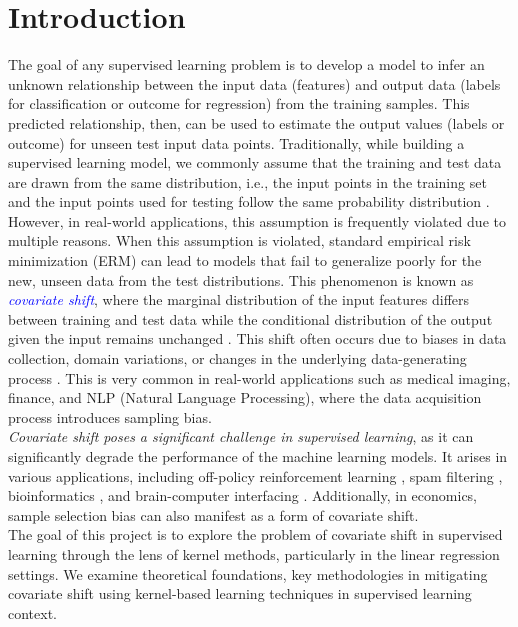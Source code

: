 \chapter{Introduction}\label{chp:1}

The goal of any supervised learning problem is to develop a model to infer an unknown relationship between the input data (features) and output data (labels for classification or outcome for regression) from the training samples. This predicted relationship, then, can be used to estimate the output values (labels or outcome) for unseen test input data points. Traditionally, while building a supervised learning model, we commonly assume that the training and test data are drawn from the same distribution, i.e., the input points in the training set and the input points used for testing follow the same probability distribution \citep{bishop1995neural, Duda2001, vapnik1998statistical, hastie2009elements}.\\

However, in real-world applications, this assumption is frequently violated due to multiple reasons. When this assumption is violated, standard empirical risk minimization (ERM) can lead to models that fail to generalize poorly for the new, unseen data from the test distributions. This phenomenon is known as \textcolor{blue}{\emph{covariate shift}}, where the marginal distribution of the input features differs between training and test data while the conditional distribution of the output given the input remains unchanged \citep{shimodaira2000improving}. This shift often occurs due to biases in data collection, domain variations, or changes in the underlying data-generating process \citep{sugiyama2000covariate}. This is very common in real-world applications such as medical imaging, finance, and NLP (Natural Language Processing), where the data acquisition process introduces sampling bias.\\

\emph{Covariate shift poses a significant challenge in supervised learning}, as it can significantly degrade the performance of the machine learning models. It arises in various applications, including off-policy reinforcement learning \citep{shelton2001importance}, spam filtering \citep{bickel2007dirichlet}, bioinformatics \citep{baldi1998bioinformatics, Borgwardt2006}, and brain-computer interfacing \citep{wolpaw2002brain}. Additionally, in economics, sample selection bias \citep{heckman1979sample} can also manifest as a form of covariate shift.\\

The goal of this project is to explore the problem of covariate shift in supervised learning through the lens of kernel methods, particularly in the linear regression settings. We examine theoretical foundations, key methodologies in mitigating covariate shift using kernel-based learning techniques in supervised learning context.